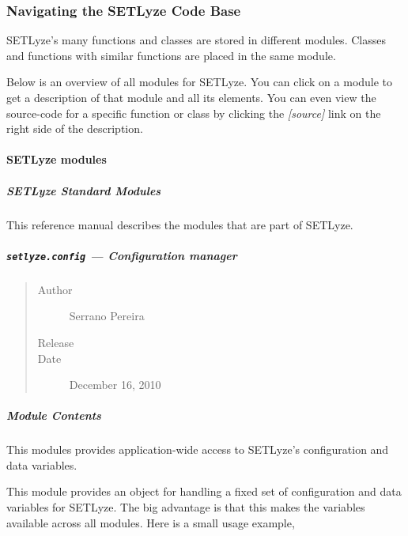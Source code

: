 \documentclass[letterpaper,10pt,english]{sphinxmanual}
\begin{document}
\subsubsection{Navigating the SETLyze Code Base}
\label{developer_guide:navigating-the-setlyze-code-base}
SETLyze's many functions and classes are stored in different modules.
Classes and functions with similar functions are placed in the same module.

Below is an overview of all modules for SETLyze. You can click on a
module to get a description of that module and all its elements. You can
even view the source-code for a specific function or class by clicking
the \emph{{[}source{]}} link on the right side of the description.


\paragraph{SETLyze modules}
\label{developer_guide:setlyze-modules}

\subparagraph{SETLyze Standard Modules}
\label{setlyze_modules:setlyze-standard-modules}\label{setlyze_modules::doc}
This reference manual describes the modules that are part of SETLyze.


\subparagraph{\texttt{setlyze.config} --- Configuration manager}
\label{setlyze/config::doc}\label{setlyze/config:setlyze-config-configuration-manager}\begin{quote}\begin{description}
\item[{Author}] \leavevmode
Serrano Pereira

\item[{Release}] 

\item[{Date}] \leavevmode
December 16, 2010

\end{description}\end{quote}


\subparagraph{Module Contents}
\label{setlyze/config:module-setlyze.config}\label{setlyze/config:module-contents}
This modules provides application-wide access to SETLyze's
configuration and data variables.

This module provides an object  for handling a fixed set of
configuration and data variables for SETLyze. The big advantage is that
this makes the variables available across all modules. Here is a small
usage example,
\end{document}
